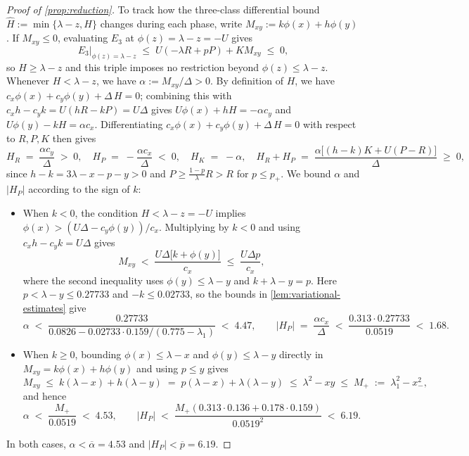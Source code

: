 \documentclass[11pt]{article}
\numberwithin{equation}{section}
\theoremstyle{plain}
\theoremstyle{definition}
\newcommand{\1}{\mathbf{1}}
\begin{document}
\begin{proof}[Proof of {\cref{prop:reduction}}]
To track how the three-class differential bound $\widehat{H} := \min\{\lambda - z, H\}$ changes during each phase, write $M_{xy} := k\phi(x) + h\phi(y)$. If $M_{xy} \le 0$, evaluating $E_3$ at $\phi(z) = \lambda - z = -U$ gives
\[
  E_3\big|_{\phi(z) = \lambda - z} \;\le\; U(-\lambda R + p P) + K M_{xy} \;\le\; 0,
\]
so $H \ge \lambda - z$ and this triple imposes no restriction beyond $\phi(z) \le \lambda - z$. Whenever $H < \lambda - z$, we have $\alpha := M_{xy}/\Delta > 0$. By definition of $H$, we have $c_x\phi(x) + c_y\phi(y) + \Delta\,H = 0$; combining this with $c_x h - c_y k = U(h R - k P) = U\Delta$ gives $U\phi(x) + h H = -\alpha c_y$ and $U\phi(y) - k H = \alpha c_x$. Differentiating $c_x\phi(x) + c_y\phi(y) + \Delta\,H = 0$ with respect to $R, P, K$ then gives
\[
  H_R \;=\; \frac{\alpha c_y}{\Delta} \;>\; 0,
  \quad
  H_P \;=\; -\frac{\alpha c_x}{\Delta} \;<\; 0,
  \quad
  H_K \;=\; -\alpha,
  \quad
  H_R + H_P \;=\; \frac{\alpha\bigl[(h - k)K + U(P - R)\bigr]}{\Delta} \;\ge\; 0,
\]
since $h - k = 3\lambda - x - p - y > 0$ and $P \ge \frac{1 - p}{\lambda}R > R$ for $p \le p_+$. We bound $\alpha$ and $|H_P|$ according to the sign of $k$:
\begin{itemize}
  \item When $k < 0$, the condition $H < \lambda - z = -U$ implies $\phi(x) > (U\Delta - c_y\phi(y))/c_x$. Multiplying by $k < 0$ and using $c_x h - c_y k = U\Delta$ gives
  \[
    M_{xy} \;<\; \frac{U\Delta\bigl[k + \phi(y)\bigr]}{c_x} \;\le\; \frac{U\Delta p}{c_x},
  \]
  where the second inequality uses $\phi(y) \le \lambda - y$ and $k + \lambda - y = p$. Here $p < \lambda - y \le 0.27733$ and $-k \le 0.02733$, so the bounds in \cref{lem:variational-estimates} give
  \[
    \alpha \;<\; \frac{0.27733}{0.0826 - 0.02733 \cdot 0.159/(0.775 - \lambda_1)} \;<\; 4.47,
    \qquad
    |H_P| \;=\; \frac{\alpha c_x}{\Delta} \;<\; \frac{0.313 \cdot 0.27733}{0.0519} \;<\; 1.68.
  \]
  \item When $k \ge 0$, bounding $\phi(x) \le \lambda - x$ and $\phi(y) \le \lambda - y$ directly in $M_{xy} = k\phi(x) + h\phi(y)$ and using $p \le y$ gives
  \[
    M_{xy} \;\le\; k(\lambda - x) + h(\lambda - y) \;=\; p(\lambda - x) + \lambda(\lambda - y) \;\le\; \lambda^2 - x y \;\le\; M_+ \;:=\; \lambda_1^2 - x_-^2,
  \]
  and hence
  \[
    \alpha \;<\; \frac{M_+}{0.0519} \;<\; 4.53,
    \qquad
    |H_P| \;<\; \frac{M_+(0.313 \cdot 0.136 + 0.178 \cdot 0.159)}{0.0519^2} \;<\; 6.19.
  \]
\end{itemize}
In both cases, $\alpha < \overline{\alpha} = 4.53$ and $|H_P| < \overline{p} = 6.19$.


\end{proof}
\end{document}
